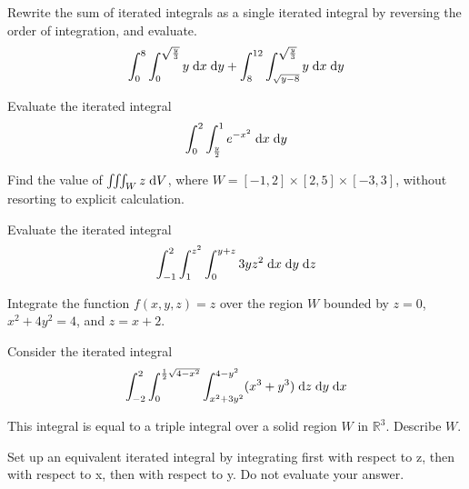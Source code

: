 \documentclass[boxes]{gsypset}
\begin{document}
	\begin{problem}[5.3.13]
		Rewrite the sum of iterated integrals as a single iterated integral by 
		reversing the order of integration, and evaluate.
		\[
			\int_0^8 \int_0^{\sqrt{\frac{y}{3}}} y \;\mathrm{d}x \;\mathrm{d}y +
			\int_8^{12} \int_{\sqrt{y-8}}^{\sqrt{\frac{y}{3}}} y \;\mathrm{d}x \;\mathrm{d}y
		\]
	\end{problem}
	\begin{solution}
		
	\end{solution}
	
	\begin{problem}[5.3.18]
		Evaluate the iterated integral
		\[
			\int_0^2 \int_{\frac{y}{2}}^1 e^{-x^2} \;\mathrm{d}x \;\mathrm{d}y
		\]
	\end{problem}
	\begin{solution}
		
	\end{solution}
	
	\begin{problem}[5.4.4]
		Find the value of $\iiint_W z \;\mathrm{d}V$, where $W = [-1,2]\times[2,5]\times[-3,3]$,
		without resorting to explicit calculation.
	\end{problem}
	\begin{solution}
		
	\end{solution}
	
	\begin{problem}[5.4.5]
		Evaluate the iterated integral
		\[
			\int_{-1}^2 \int_1^{z^2} \int_0^{y+z} 3yz^2 \;\mathrm{d}x \;\mathrm{d}y \;\mathrm{d}z
		\]
	\end{problem}
	\begin{solution}
		
	\end{solution}
	
	\begin{problem}[5.4.18]
		Integrate the function $f(x,y,z) = z$ over the region $W$ bounded by
		$z = 0$, $x^2 + 4y^2 = 4$, and $z = x + 2$.
	\end{problem}
	\begin{solution}
		
	\end{solution}
	
	\begin{problem}[5.4.29ab]
		Consider the iterated integral
		\[
			\int _{-2} ^2
				\int _0 ^{\frac{1}{2} \sqrt{4 - x^2}}
					\int _{x^2 + 3y^2} ^{4 - y^2}
						(x^3+y^3)
					\;\mathrm{d}z
				\;\mathrm{d}y
			\;\mathrm{d}x
		\]
		\begin{subproblems}
			\subproblem
				This integral is equal to a triple integral over a solid region $W$ in $\mathbb{R}^3$.
				Describe $W$.
				\begin{solution}
					
				\end{solution}
			\subproblem
				Set up an equivalent iterated integral by integrating first with respect to z, 
				then with respect to x, then with respect to y. 
				Do not evaluate your answer.
				\begin{solution}
					
				\end{solution}
		\end{subproblems}
	\end{problem}
\end{document}
